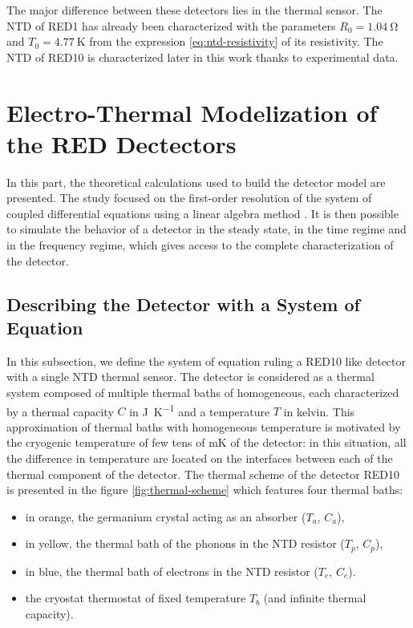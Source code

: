 The major difference between these detectors lies in the thermal sensor. The NTD of RED1 has already been characterized with the parameters $R_0 = \SI{1.04}{\ohm}$ and $T_0 = \SI{4.77}{\kelvin}$ from the expression \ref{eq:ntd-resistivity} of its resistivity.
The NTD of RED10 is characterized later in this work thanks to experimental data.

\section{Electro-Thermal Modelization of the RED Dectectors}
\label{sec:electro-thermal-model}

In this part, the theoretical calculations used to build the detector model are presented. The study focused on the first-order resolution of the system of coupled differential equations using a linear algebra method \cite{Figueroa:2006}. 
It is then possible to simulate the behavior of a detector in the steady state, in the time regime and in the frequency regime, which gives access to the complete characterization of the detector.

\subsection{Describing the Detector with a System of Equation}



In this subsection, we define the system of equation ruling a RED10 like detector with a single NTD thermal sensor. The detector is considered as a thermal system composed of multiple thermal baths of homogeneous, each characterized by a thermal capacity $C$ in \si{\joule\per\kelvin} and a temperature $T$ in \si{kelvin}.
This approximation of thermal baths with homogeneous temperature is motivated by the cryogenic temperature of few tens of \si{\milli\kelvin} of the detector: in this situation, all the difference in temperature are located on the interfaces between each of the thermal component of the detector.
The thermal scheme of the detector RED10 is presented in the figure \ref{fig:thermal-scheme} which features four thermal baths:
\begin{itemize}
\item in orange, the germanium crystal acting as an absorber ($T_a$, $C_a$),
\item in yellow, the thermal bath of the phonons in the NTD resistor ($T_p$, $C_p$),
\item in blue, the thermal bath of electrons in the NTD resistor ($T_e$, $C_e$).
\item the cryostat thermostat of fixed temperature $T_b$ (and infinite thermal capacity).
\end{itemize}

